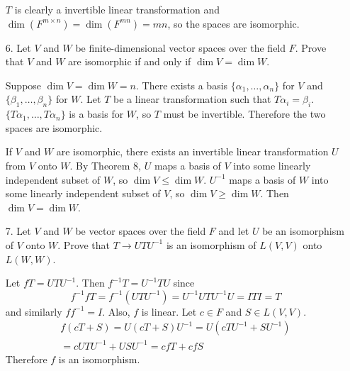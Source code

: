 \documentclass{article}
\begin{document}
\begin{enumerate}[listparindent=\parindent]
    \(T\) is clearly a invertible linear transformation and \\
    \(\dim(F^{m \times n}) = \dim(F^{mn}) = mn\), so the spaces are isomorphic.

\item[6.] Let \(V\) and \(W\) be finite-dimensional vector spaces over the field \(F\). Prove that \(V\) and \(W\) are isomorphic if and only if \(\dim V = \dim W\).

    Suppose \(\dim V = \dim W = n\). There exists a basis \(\{\alpha_1, \dots, \alpha_n\}\) for \(V\) and \(\{\beta_1, \dots, \beta_n\}\) for \(W\).
    Let \(T\) be a linear transformation such that \(T\alpha_i = \beta_i\). \(\{T\alpha_1, \dots, T\alpha_n\}\) is a basis for \(W\), so \(T\) must be invertible.
    Therefore the two spaces are isomorphic.

    If \(V\) and \(W\) are isomorphic, there exists an invertible linear transformation \(U\) from \(V\) onto \(W\).
    By Theorem 8, \(U\) maps a basis of \(V\) into some linearly independent subset of \(W\), so \(\dim V \leq \dim W\).
    \(U^{-1}\) maps a basis of \(W\) into some linearly independent subset of \(V\), so \(\dim V \geq \dim W\).
    Then \(\dim V = \dim W\).

\item[7.] Let \(V\) and \(W\) be vector spaces over the field \(F\) and let \(U\) be an isomorphism of \(V\) onto \(W\).
    Prove that \(T \rightarrow UTU^{-1}\) is an isomorphism of \(L(V, V)\) onto \(L(W, W)\).

    Let \(fT = UTU^{-1}\). Then \(f^{-1}T = U^{-1}TU\) since \[ f^{-1}fT = f^{-1}(UTU^{-1}) = U^{-1}UTU^{-1}U = ITI = T \] and similarly \(ff^{-1} = I\).
    Also, \(f\) is linear. Let \(c \in F\) and \(S \in L(V, V)\).
    \begin{gather*}
        f(cT + S) = U(cT + S)U^{-1} = U(cTU^{-1} + SU^{-1}) \\
        = cUTU^{-1} + USU^{-1} = cfT + cfS
    \end{gather*}
    Therefore \(f\) is an isomorphism.

\end{enumerate}
\end{document}
